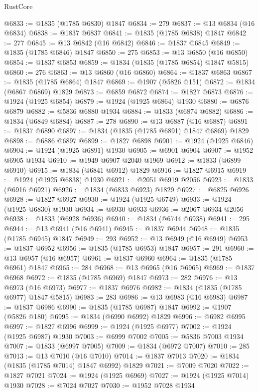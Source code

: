 \begin{lexlean}{RustCore}
\begin{coremodule}
@6833 := @1835 (@1785 @6830) @1847
@6834 := 279
@6837 := @13 @6834 (@16 @6834)
@6838 := @1837 @6837
@6841 := @1835 (@1785 @6838) @1847
@6842 := 277
@6845 := @13 @6842 (@16 @6842)
@6846 := @1837 @6845
@6849 := @1835 (@1785 @6846) @1847
@6850 := 275
@6853 := @13 @6850 (@16 @6850)
@6854 := @1837 @6853
@6859 := @1834 (@1835 (@1785 @6854) @1847 @5815)
@6860 := 276
@6863 := @13 @6860 (@16 @6860)
@6864 := @1837 @6863
@6867 := @1835 (@1785 @6864) @1847
@6869 := @1907 (@5826 @151)
@6872 := @1834 (@6867 @6869) @1829
@6873 := @6859 @6872
@6874 := @1827 @6873
@6876 := @1924 (@1925 @6854)
@6879 := @1924 (@1925 @6864) @1930
@6880 := @6876 @6879
@6882 := @5836 @6880 @1934
@6884 := @1833 (@6874 @6882)
@6886 := @1834 (@6849 @6884)
@6887 := 278
@6890 := @13 @6887 (@16 @6887)
@6891 := @1837 @6890
@6897 := @1834 (@1835 (@1785 @6891) @1847 @6869) @1829
@6898 := @6886 @6897
@6899 := @1827 @6898
@6901 := @1924 (@1925 @6846)
@6904 := @1924 (@1925 @6891) @1930
@6905 := @6901 @6904
@6907 := @1952 @6905 @1934
@6910 := @1949 @6907 @2040 @1969
@6912 := @1833 (@6899 @6910)
@6915 := @1834 (@6841 @6912) @1829
@6916 := @1827 @6915
@6919 := @1924 (@1925 @6838) @1930
@6921 := @2051 @6919 @2056
@6923 := @1833 (@6916 @6921)
@6926 := @1834 (@6833 @6923) @1829
@6927 := @6825 @6926
@6928 := @1827 @6927
@6930 := @1924 (@1925 @6749)
@6933 := @1924 (@1925 @6830) @1930
@6934 := @6930 @6933
@6936 := @2067 @6934 @2056
@6938 := @1833 (@6928 @6936)
@6940 := @1834 (@6744 @6938)
@6941 := 295
@6944 := @13 @6941 (@16 @6941)
@6945 := @1837 @6944
@6948 := @1835 (@1785 @6945) @1847
@6949 := 293
@6952 := @13 @6949 (@16 @6949)
@6953 := @1837 @6952
@6956 := @1835 (@1785 @6953) @1847
@6957 := 291
@6960 := @13 @6957 (@16 @6957)
@6961 := @1837 @6960
@6964 := @1835 (@1785 @6961) @1847
@6965 := 284
@6968 := @13 @6965 (@16 @6965)
@6969 := @1837 @6968
@6972 := @1835 (@1785 @6969) @1847
@6973 := 282
@6976 := @13 @6973 (@16 @6973)
@6977 := @1837 @6976
@6982 := @1834 (@1835 (@1785 @6977) @1847 @5815)
@6983 := 283
@6986 := @13 @6983 (@16 @6983)
@6987 := @1837 @6986
@6990 := @1835 (@1785 @6987) @1847
@6992 := @1907 (@5826 @180)
@6995 := @1834 (@6990 @6992) @1829
@6996 := @6982 @6995
@6997 := @1827 @6996
@6999 := @1924 (@1925 @6977)
@7002 := @1924 (@1925 @6987) @1930
@7003 := @6999 @7002
@7005 := @5836 @7003 @1934
@7007 := @1833 (@6997 @7005)
@7009 := @1834 (@6972 @7007)
@7010 := 285
@7013 := @13 @7010 (@16 @7010)
@7014 := @1837 @7013
@7020 := @1834 (@1835 (@1785 @7014) @1847 @6992) @1829
@7021 := @7009 @7020
@7022 := @1827 @7021
@7024 := @1924 (@1925 @6969)
@7027 := @1924 (@1925 @7014) @1930
@7028 := @7024 @7027
@7030 := @1952 @7028 @1934

\end{coremodule}
\end{lexlean}
